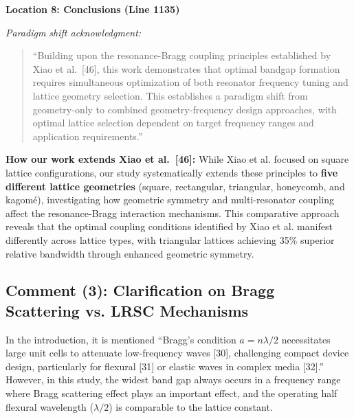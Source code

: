 \documentclass[11pt,a4paper]{article}
\newenvironment{reviewerbox}{%
    \par\medskip\noindent{\color{reviewercolor}\rule{\linewidth}{2pt}}\par
    \noindent{\color{reviewercolor}\bfseries Reviewer Comment}\par\smallskip
}{%
    \par\noindent{\color{reviewercolor}\rule{\linewidth}{0.5pt}}\medskip
}
\newenvironment{changesbox}{%
    \par\medskip\noindent{\color{changescolor}\rule{\linewidth}{2pt}}\par
    \noindent{\color{changescolor}\bfseries Manuscript Changes}\par\smallskip
}{%
    \par\noindent{\color{changescolor}\rule{\linewidth}{0.5pt}}\medskip
}
\begin{document}
\begin{changesbox}
\textbf{Location 8: Conclusions (Line 1135)}

\textit{Paradigm shift acknowledgment:}
\begin{quote}
\textcolor{redtext}{``Building upon the resonance-Bragg coupling principles established by Xiao et al.~[46], this work demonstrates that optimal bandgap formation requires simultaneous optimization of both resonator frequency tuning and lattice geometry selection. This establishes a paradigm shift from geometry-only to combined geometry-frequency design approaches, with optimal lattice selection dependent on target frequency ranges and application requirements.''}
\end{quote}
\end{changesbox}

\textbf{How our work extends Xiao et al.~[46]:} While Xiao et al. focused on square lattice configurations, our study systematically extends these principles to \textbf{five different lattice geometries} (square, rectangular, triangular, honeycomb, and kagomé), investigating how geometric symmetry and multi-resonator coupling affect the resonance-Bragg interaction mechanisms. This comparative approach reveals that the optimal coupling conditions identified by Xiao et al. manifest differently across lattice types, with triangular lattices achieving 35\% superior relative bandwidth through enhanced geometric symmetry.

\newpage

\subsection*{Comment (3): Clarification on Bragg Scattering vs. LRSC Mechanisms}

\begin{reviewerbox}
In the introduction, it is mentioned ``Bragg's condition $a = n\lambda/2$ necessitates large unit cells to attenuate low-frequency waves [30], challenging compact device design, particularly for flexural [31] or elastic waves in complex media [32].'' However, in this study, the widest band gap always occurs in a frequency range where Bragg scattering effect plays an important effect, and the operating half flexural wavelength ($\lambda/2$) is comparable to the lattice constant.
\end{reviewerbox}
\end{document}
